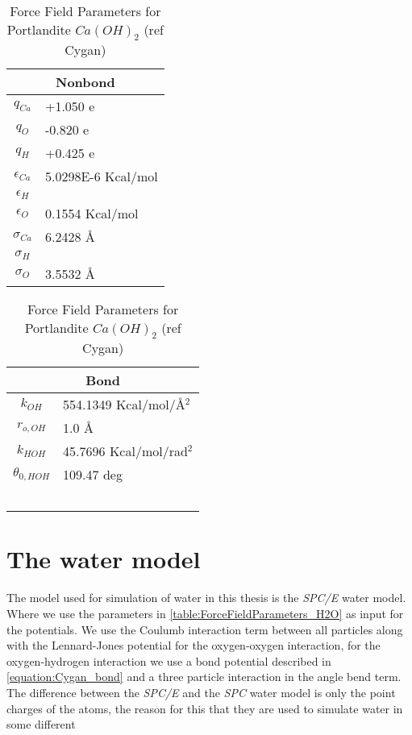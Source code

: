 \documentclass[twoside,english]{uiofysmaster}
\begin{document}
\begin{table}
 \caption{Force Field Parameters for Portlandite $Ca(OH)_2$ (ref Cygan)}
  \begin{tabular}[]{|c|l|}
  \hline
  \multicolumn{2}{|c|}{Nonbond} \\ \hline
  $q_{Ca}$ & +1.050 e  \\ \hline
  $q_O$ & -0.820 e  \\ \hline
  $q_H$ & +0.425 e  \\ \hline

  $\epsilon _{Ca}$ & 5.0298E-6 Kcal/mol \\ \hline
  $\epsilon _H$ &  \\ \hline
  $\epsilon _O$ & 0.1554 Kcal/mol \\ \hline
  $\sigma _{Ca}$ & 6.2428 \AA{} \\ \hline
  $\sigma _H$ &  \\ \hline
  $\sigma _O$ & 3.5532 \AA{} \\ \hline
 \end{tabular}
  \begin{tabular}[]{|c|l|}
  \hline
  \multicolumn{2}{|c|}{Bond} \\ \hline
  $k_{OH}$ & 554.1349 Kcal/mol/\AA{}$^2$  \\ \hline
  $r_{o,OH}$ & 1.0 \AA{}  \\ \hline
  $k_{HOH}$ & 45.7696 Kcal/mol/rad$^2$ \\ \hline
  $\theta _{0,HOH}$ & 109.47 deg \\ \hline
                    &           \\ \hline
                    &           \\ \hline
		    &           \\ \hline
                    &           \\ \hline
                    &           \\ \hline

 \end{tabular}
 \label{table:ForceFieldParameters_Portlandite}
\end{table}


\section{The water model}
The model used for simulation of water in this thesis is the \textit{SPC/E} water model. Where we use the parameters in \ref{table:ForceFieldParameters_H2O} as input for the potentials. We use the Coulumb interaction term between all particles along with the Lennard-Jones potential for the oxygen-oxygen interaction, for the oxygen-hydrogen interaction we use a bond potential described in \ref{equation:Cygan_bond} and a three particle interaction in the angle bend term. The difference between the \textit{SPC/E} and the \textit{SPC} water model is only the point charges of the atoms, the reason for this that they are used to simulate water in some different 
\end{document}
